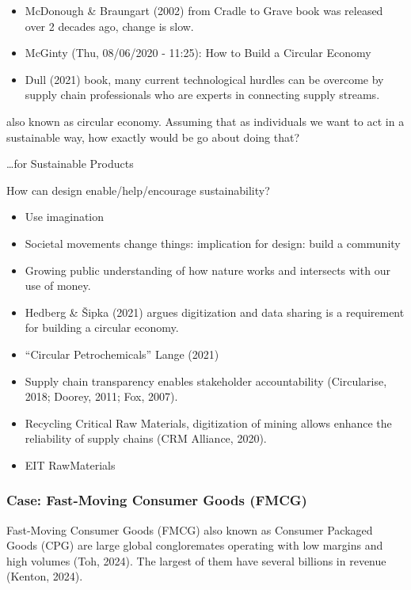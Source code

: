 \documentclass[
  letterpaper,
  DIV=11,
  numbers=noendperiod]{scrartcl}
\begin{document}
\begin{itemize}
\item
  McDonough \& Braungart (2002) from Cradle to Grave book was released
  over 2 decades ago, change is slow.
\item
  McGinty (Thu, 08/06/2020 - 11:25): How to Build a Circular Economy
\item
  Dull (2021) book, many current technological hurdles can be overcome
  by supply chain professionals who are experts in connecting supply
  streams.
\end{itemize}

also known as circular economy. Assuming that as individuals we want to
act in a sustainable way, how exactly would be go about doing that?

\ldots for Sustainable Products

How can design enable/help/encourage sustainability?

\begin{itemize}
\item
  Use imagination
\item
  Societal movements change things: implication for design: build a
  community
\item
  Growing public understanding of how nature works and intersects with
  our use of money.
\item
  Hedberg \& Šipka (2021) argues digitization and data sharing is a
  requirement for building a circular economy.
\item
  ``Circular Petrochemicals'' Lange (2021)
\item
  Supply chain transparency enables stakeholder accountability
  (Circularise, 2018; Doorey, 2011; Fox, 2007).
\item
  Recycling Critical Raw Materials, digitization of mining allows
  enhance the reliability of supply chains (CRM Alliance, 2020).
\item
  EIT RawMaterials
\end{itemize}

\subsubsection{Case: Fast-Moving Consumer Goods
(FMCG)}\label{case-fast-moving-consumer-goods-fmcg}

Fast-Moving Consumer Goods (FMCG) also known as Consumer Packaged Goods
(CPG) are large global congloremates operating with low margins and high
volumes (Toh, 2024). The largest of them have several billions in
revenue (Kenton, 2024).
\end{document}
